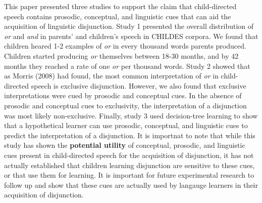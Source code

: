 \documentclass[,man,floatsintext]{apa6}
\begin{document}
This paper presented three studies to support the claim that child-directed speech contains prosodic, conceptual, and linguistic cues that can aid the acquisition of linguistic disjunction. Study 1 presented the overall distribution of \emph{or} and \emph{and} in parents' and children's speech in CHILDES corpora. We found that children heared 1-2 examples of \emph{or} in every thousand words parents produced. Children started producing \emph{or} themselves between 18-30 months, and by 42 months they reached a rate of one \emph{or} per thousand words. Study 2 showed that as Morris (2008) had found, the most common interpretation of \emph{or} in child-directed speech is exclusive disjunction. However, we also found that exclusive interpretations were cued by prosodic and conceptual cues. In the absence of prosodic and conceptual cues to exclusivity, the interpretation of a disjunction was most likely non-exclusive. Finally, study 3 used decision-tree learning to show that a hypothetical learner can use prosodic, conceptual, and linguistic cues to predict the interpretation of a disjunction. It is importnat to note that while this study has shown the \textbf{potential utility} of conceptual, prosodic, and linguistic cues present in child-directed speech for the acquisition of disjunction, it has not actually established that children learning disjunction are sensitive to these cues, or that use them for learning. It is important for future experimental research to follow up and show that these cues are actually used by langauge learners in their acquisition of disjunction.
\end{document}
